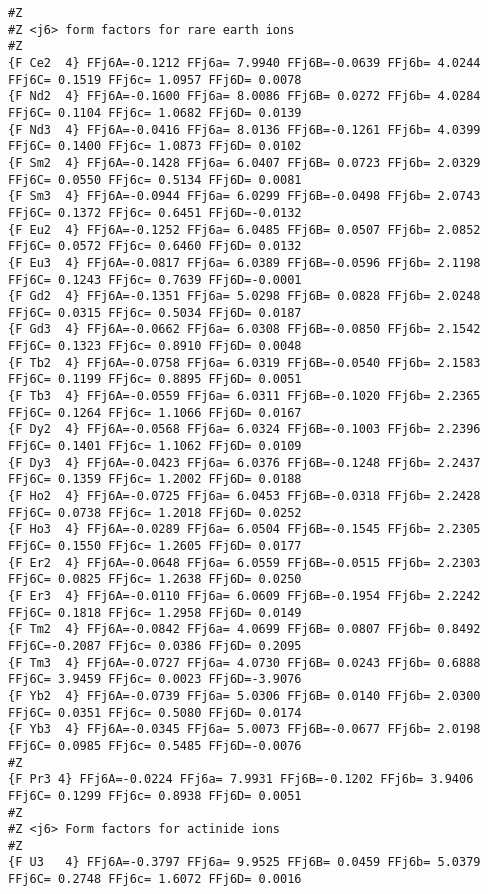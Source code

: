 {\begin{verbatim}
#Z
#Z <j6> form factors for rare earth ions
#Z
{F Ce2  4} FFj6A=-0.1212 FFj6a= 7.9940 FFj6B=-0.0639 FFj6b= 4.0244 FFj6C= 0.1519 FFj6c= 1.0957 FFj6D= 0.0078 
{F Nd2  4} FFj6A=-0.1600 FFj6a= 8.0086 FFj6B= 0.0272 FFj6b= 4.0284 FFj6C= 0.1104 FFj6c= 1.0682 FFj6D= 0.0139 
{F Nd3  4} FFj6A=-0.0416 FFj6a= 8.0136 FFj6B=-0.1261 FFj6b= 4.0399 FFj6C= 0.1400 FFj6c= 1.0873 FFj6D= 0.0102 
{F Sm2  4} FFj6A=-0.1428 FFj6a= 6.0407 FFj6B= 0.0723 FFj6b= 2.0329 FFj6C= 0.0550 FFj6c= 0.5134 FFj6D= 0.0081 
{F Sm3  4} FFj6A=-0.0944 FFj6a= 6.0299 FFj6B=-0.0498 FFj6b= 2.0743 FFj6C= 0.1372 FFj6c= 0.6451 FFj6D=-0.0132 
{F Eu2  4} FFj6A=-0.1252 FFj6a= 6.0485 FFj6B= 0.0507 FFj6b= 2.0852 FFj6C= 0.0572 FFj6c= 0.6460 FFj6D= 0.0132 
{F Eu3  4} FFj6A=-0.0817 FFj6a= 6.0389 FFj6B=-0.0596 FFj6b= 2.1198 FFj6C= 0.1243 FFj6c= 0.7639 FFj6D=-0.0001 
{F Gd2  4} FFj6A=-0.1351 FFj6a= 5.0298 FFj6B= 0.0828 FFj6b= 2.0248 FFj6C= 0.0315 FFj6c= 0.5034 FFj6D= 0.0187 
{F Gd3  4} FFj6A=-0.0662 FFj6a= 6.0308 FFj6B=-0.0850 FFj6b= 2.1542 FFj6C= 0.1323 FFj6c= 0.8910 FFj6D= 0.0048 
{F Tb2  4} FFj6A=-0.0758 FFj6a= 6.0319 FFj6B=-0.0540 FFj6b= 2.1583 FFj6C= 0.1199 FFj6c= 0.8895 FFj6D= 0.0051 
{F Tb3  4} FFj6A=-0.0559 FFj6a= 6.0311 FFj6B=-0.1020 FFj6b= 2.2365 FFj6C= 0.1264 FFj6c= 1.1066 FFj6D= 0.0167 
{F Dy2  4} FFj6A=-0.0568 FFj6a= 6.0324 FFj6B=-0.1003 FFj6b= 2.2396 FFj6C= 0.1401 FFj6c= 1.1062 FFj6D= 0.0109 
{F Dy3  4} FFj6A=-0.0423 FFj6a= 6.0376 FFj6B=-0.1248 FFj6b= 2.2437 FFj6C= 0.1359 FFj6c= 1.2002 FFj6D= 0.0188 
{F Ho2  4} FFj6A=-0.0725 FFj6a= 6.0453 FFj6B=-0.0318 FFj6b= 2.2428 FFj6C= 0.0738 FFj6c= 1.2018 FFj6D= 0.0252 
{F Ho3  4} FFj6A=-0.0289 FFj6a= 6.0504 FFj6B=-0.1545 FFj6b= 2.2305 FFj6C= 0.1550 FFj6c= 1.2605 FFj6D= 0.0177 
{F Er2  4} FFj6A=-0.0648 FFj6a= 6.0559 FFj6B=-0.0515 FFj6b= 2.2303 FFj6C= 0.0825 FFj6c= 1.2638 FFj6D= 0.0250 
{F Er3  4} FFj6A=-0.0110 FFj6a= 6.0609 FFj6B=-0.1954 FFj6b= 2.2242 FFj6C= 0.1818 FFj6c= 1.2958 FFj6D= 0.0149 
{F Tm2  4} FFj6A=-0.0842 FFj6a= 4.0699 FFj6B= 0.0807 FFj6b= 0.8492 FFj6C=-0.2087 FFj6c= 0.0386 FFj6D= 0.2095 
{F Tm3  4} FFj6A=-0.0727 FFj6a= 4.0730 FFj6B= 0.0243 FFj6b= 0.6888 FFj6C= 3.9459 FFj6c= 0.0023 FFj6D=-3.9076 
{F Yb2  4} FFj6A=-0.0739 FFj6a= 5.0306 FFj6B= 0.0140 FFj6b= 2.0300 FFj6C= 0.0351 FFj6c= 0.5080 FFj6D= 0.0174 
{F Yb3  4} FFj6A=-0.0345 FFj6a= 5.0073 FFj6B=-0.0677 FFj6b= 2.0198 FFj6C= 0.0985 FFj6c= 0.5485 FFj6D=-0.0076 
#Z
{F Pr3 4} FFj6A=-0.0224 FFj6a= 7.9931 FFj6B=-0.1202 FFj6b= 3.9406 FFj6C= 0.1299 FFj6c= 0.8938 FFj6D= 0.0051 
#Z
#Z <j6> Form factors for actinide ions
#Z
{F U3   4} FFj6A=-0.3797 FFj6a= 9.9525 FFj6B= 0.0459 FFj6b= 5.0379 FFj6C= 0.2748 FFj6c= 1.6072 FFj6D= 0.0016 

\end{verbatim}}
